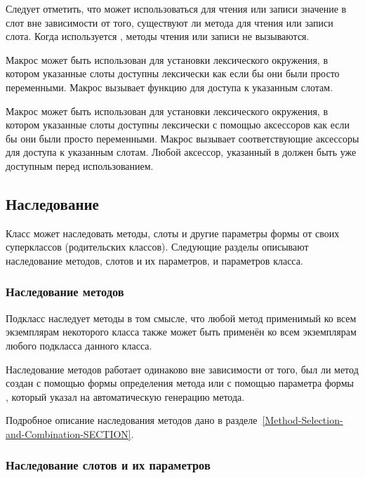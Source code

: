 Следует отметить, что  может использоваться для чтения или
записи значение в слот вне зависимости от того, существуют ли метода для чтения
или записи слота.
Когда используется , методы чтения или записи не вызываются.

Макрос  может быть использован для установки лексического
окружения, в котором указанные слоты доступны лексически как если бы они были
просто переменными. Макрос  вызывает функцию 
для доступа к указанным слотам.

Макрос  может быть использован для установки лексического
окружения, в котором указанные слоты доступны лексически с помощью аксессоров
как если бы они были просто переменными. Макрос  вызывает
соответствующие аксессоры для доступа к указанным слотам. Любой аксессор,
указанный в  должен быть уже доступным перед
использованием.

\subsection{Наследование}
\label{Inheritance-SECTION}

Класс может наследовать методы, слоты и другие параметры формы  от
своих суперклассов (родительских классов). Следующие разделы описывают
наследование методов, слотов и их параметров, и параметров класса.

\subsubsection{Наследование методов}
\label{Inheritance-of-Methods-SECTION}

Подкласс наследует методы в том смысле, что любой метод применимый ко всем
экземплярам некоторого класса также может быть применён ко всем экземплярам
любого подкласса данного класса.

Наследование методов работает одинаково вне зависимости от того, был ли метод
создан с помощью формы определения метода или с помощью параметра формы
, который указал на автоматическую генерацию метода.

Подробное описание наследования методов дано в
разделе~\ref{Method-Selection-and-Combination-SECTION}.

\subsubsection{Наследование слотов и их параметров}
\label{Inheritance-of-Slots-and-Slot-Options-SECTION}

